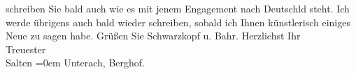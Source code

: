 \begin{ledgroupsized}[t]{13cm}
               schreiben Sie bald auch wie es mit jenem Engagement nach Deutschld steht. \pend
           \pstart
           Ich werde übrigens auch bald wieder schreiben, sobald ich Ihnen künstlerisch ei{\pb}niges Neue zu sagen habe. Grüßen
               Sie Schwarzkopf u. Bahr.\pend
           \pstart
           Herzlichst Ihr
               {\\[\baselineskip]}Treuester
               {\\[\baselineskip]}\spacefill\mbox{Salten}\pend
           \leftskip=0em{}\pstart
           \noindent{}Unterach, Berghof.
               \pend
           
         
         \endnumbering{}\end{ledgroupsized}\begin{anhang}\end{anhang}\newcommand{\dateiname}{L03111}\newcommand{\titel}{Felix Salten an Arthur Schnitzler, 8. 8. 1892}\newcommand{\editorInnen}{Martin Anton Müller und Laura Untner}
      